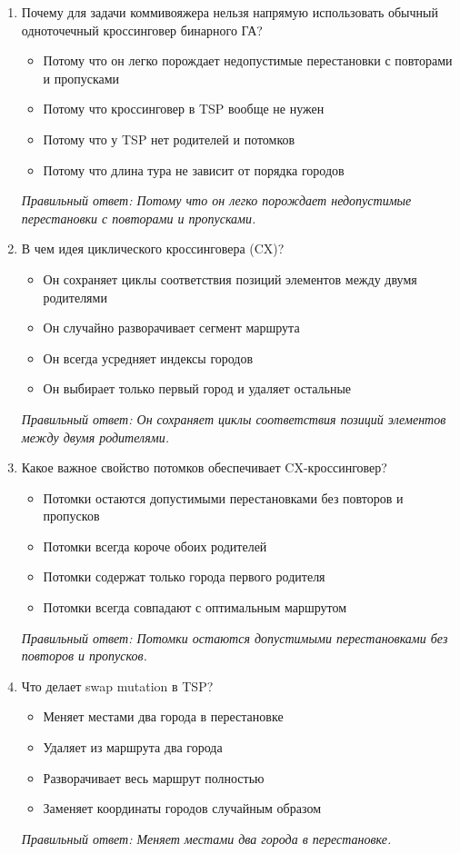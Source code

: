 \begin{enumerate}[label=\textbf{\arabic*.}, leftmargin=0pt, itemsep=1.2em]
\item Почему для задачи коммивояжера нельзя напрямую использовать обычный одноточечный кроссинговер бинарного ГА?
\begin{itemize}[label=$\square$, leftmargin=1.5cm, itemsep=0.2em, topsep=0.3em]
\item Потому что он легко порождает недопустимые перестановки с повторами и пропусками
\item Потому что кроссинговер в TSP вообще не нужен
\item Потому что у TSP нет родителей и потомков
\item Потому что длина тура не зависит от порядка городов
\end{itemize}
{\small\textit{Правильный ответ: Потому что он легко порождает недопустимые перестановки с повторами и пропусками.}}

\item В чем идея циклического кроссинговера (CX)?
\begin{itemize}[label=$\square$, leftmargin=1.5cm, itemsep=0.2em, topsep=0.3em]
\item Он сохраняет циклы соответствия позиций элементов между двумя родителями
\item Он случайно разворачивает сегмент маршрута
\item Он всегда усредняет индексы городов
\item Он выбирает только первый город и удаляет остальные
\end{itemize}
{\small\textit{Правильный ответ: Он сохраняет циклы соответствия позиций элементов между двумя родителями.}}

\item Какое важное свойство потомков обеспечивает CX-кроссинговер?
\begin{itemize}[label=$\square$, leftmargin=1.5cm, itemsep=0.2em, topsep=0.3em]
\item Потомки остаются допустимыми перестановками без повторов и пропусков
\item Потомки всегда короче обоих родителей
\item Потомки содержат только города первого родителя
\item Потомки всегда совпадают с оптимальным маршрутом
\end{itemize}
{\small\textit{Правильный ответ: Потомки остаются допустимыми перестановками без повторов и пропусков.}}

\item Что делает swap mutation в TSP?
\begin{itemize}[label=$\square$, leftmargin=1.5cm, itemsep=0.2em, topsep=0.3em]
\item Меняет местами два города в перестановке
\item Удаляет из маршрута два города
\item Разворачивает весь маршрут полностью
\item Заменяет координаты городов случайным образом
\end{itemize}
{\small\textit{Правильный ответ: Меняет местами два города в перестановке.}}


\end{enumerate}
